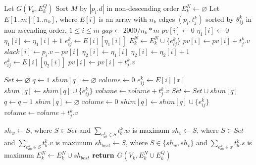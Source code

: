 \documentclass[preprint,authoryear]{elsarticle}
\begin{document}
\begin{algorithm}[H]
	\caption{ $SolveNode(Shims, k, G)$}  \label{alg:shims}
	\begin{algorithmic}[1]
		\State Let $G(V_k, E^Q_k)$
		\State Sort $M$ by $|p_i.d|$ in non-descending order \label{shims:pallets}
		\State $E^N_k \gets \varnothing$ 
		\State Let $E[1..m][1..n_k]$, where $E[i]$ is an array with $n_k$ edges $(p_i,t^k_j)$ sorted by $\theta_{ij}^k$ in non-ascending order, $1 \leq i \leq m$ \label{shims:edges}
		\State $gap \gets 2000/n_k*m$ \label{shims:gap} 
			\State $pv[i] \gets 0$		\label{shims:phase1a}
			\State $\eta_1[i] \gets 0$
			 \label{shims1:slack}
				\State $\eta_1[i] \gets \eta_1[i] + 1$ \label{shims:eta1}
				\State $e^k_{ij} \gets E[i][\eta_1[i]]$
					\State $E^N_k \gets E^N_k \cup \{e^k_{ij}\}$
					\State $pv[i] \gets pv[i] + t^k_j.v$ 
				\EndIf
			\EndWhile 
			\State $slack[i] \gets p_i.v - pv[i]$
			\State $\eta_2[i] \gets \eta_1[i]$
			\Repeat
				\State $\eta_2[i] \gets \eta_2[i] + 1$  \label{shims:eta2}
				\State $e^k_{ij} \gets E[i][\eta_2[i]]$
				\State $pv[i] \gets pv[i] + t^k_j.v$
			 \label{shims:phase1b}
			
\State $Set \gets \varnothing$  \label{shims:phase2a}
\State $q \gets 1$
\State $shim[q] \gets \varnothing$
\State $volume \gets 0$
\State $e_{ij}^k \gets E[i][x]$
 \label{bincapacity}
\State $shim[q] \gets shim[q] \cup \{e_{ij}^k\}$	
\State $volume \gets volume + t_j^k.v$	
\Else \label{newbins}
\State $Set \gets Set \cup shim[q] $
\State $q \gets q+1$
\State $shim[q] \gets \varnothing$
\State $volume \gets 0$
\State $shim[q] \gets shim[q] \cup \{e_{ij}^k\}$	
\State $volume \gets volume + t_j^k.v$
\EndIf
\EndIf
\EndIf
\EndFor   \label{shims:phase2b}
			
			\State $sh_w \gets S$, where $S \in Set$ and $\sum_{e_{ab}^k \in S} t_b^k.w$ is maximum \label{shims:phase3a}
			\State $sh_v \gets S$, where $S \in Set$ and $\sum_{e_{ab}^k \in S} t_b^k.v$ is maximum
			\State $sh_{best} \gets S$, where $S \in \{sh_w, sh_v\}$ and $\sum_{e_{ab}^k \in x} t_b^k.s$ is maximum
			\State $E^N_k \gets E^N_k \cup sh_{best}$ \label{shims:phase3b}
		\EndFor
		\State ${\bf return}$ $G(V_k, E^N_k \cup E^Q_k)$
	\end{algorithmic}
\end{algorithm}
\end{document}
